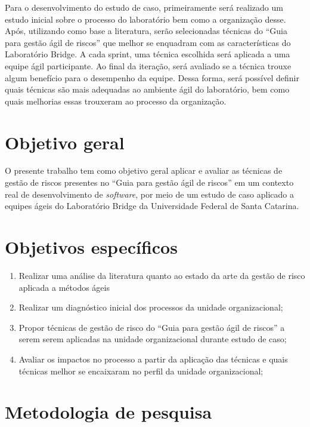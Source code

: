 \documentclass[
    12pt,       %
    openright,      %
    twoside,      %
    a4paper,      %
    english,      %
    french,       %
    spanish,      %
    brazil,       %
    ]{abntex2}
\begin{document}
Para o desenvolvimento do estudo de caso, primeiramente será realizado um estudo inicial sobre o processo do laboratório bem como a organização desse. Após, utilizando como base a literatura, serão selecionadas técnicas do “Guia para gestão ágil de riscos” \cite{Vieira:2020} que melhor se enquadram com as características do Laboratório Bridge. A cada sprint, uma técnica escolhida será aplicada a uma equipe ágil participante. Ao final da iteração, será avaliado se a técnica trouxe algum benefício para o desempenho da equipe. Dessa forma, será possível definir quais técnicas são mais adequadas ao ambiente ágil do laboratório, bem como quais melhorias essas trouxeram ao processo da organização.

\section{Objetivo geral}

O presente trabalho tem como objetivo geral aplicar e avaliar as técnicas de gestão de riscos presentes no “Guia para gestão ágil de riscos” \cite{Vieira:2020} em um contexto real de desenvolvimento de \textit{software}, por meio de um estudo de caso aplicado a equipes ágeis do Laboratório Bridge da Universidade Federal de Santa Catarina.

\section{Objetivos específicos}
\begin{enumerate}
     \item Realizar uma análise da literatura quanto ao estado da arte da gestão de risco aplicada a métodos ágeis
    \item Realizar um diagnóstico inicial dos processos da unidade organizacional;
    \item Propor técnicas de gestão de risco do “Guia para gestão ágil de riscos” \cite{Vieira:2020} a serem serem aplicadas na unidade organizacional durante estudo de caso;
    \item Avaliar os impactos no processo a partir da aplicação das técnicas e quais técnicas melhor se encaixaram no perfil da unidade organizacional;
\end{enumerate}

\section{Metodologia de pesquisa}
\end{document}
